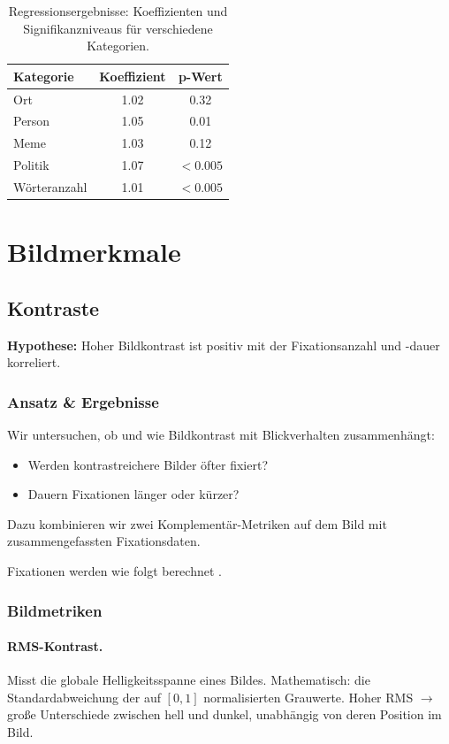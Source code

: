 \documentclass[
    language=german, %
    thesis=seminar, %
    supervisor=postdoc, %
    multiauthor=true, %
    ]{settings/csssa-thesis}
\begin{document}
\begin{table}[htbp]
\centering
\begin{tabular}{lcc}
\hline
\textbf{Kategorie} & \textbf{Koeffizient} & \textbf{p-Wert} \\
\hline
Ort          & 1.02 & 0.32      \\
Person       & 1.05 & 0.01      \\
Meme         & 1.03 & 0.12      \\
Politik      & 1.07 & $<0.005$ \\
Wörteranzahl & 1.01 & $<0.005$ \\
\hline
\end{tabular}
\caption{Regressionsergebnisse: Koeffizienten und Signifikanzniveaus für verschiedene Kategorien.}
\label{tab:kategorien}
\end{table}

\section{Bildmerkmale}
\subsection{Kontraste}

\textbf{Hypothese:} Hoher Bildkontrast ist positiv mit der Fixationsanzahl und -dauer korreliert. 

\subsubsection{Ansatz \& Ergebnisse}
Wir untersuchen, ob und wie Bildkontrast mit Blickverhalten zusammenhängt: 
\begin{itemize}
    \item Werden kontrastreichere Bilder öfter fixiert? 
    \item Dauern Fixationen länger oder kürzer? 
\end{itemize}
Dazu kombinieren wir zwei Komplementär-Metriken auf dem Bild mit zusammengefassten Fixationsdaten. 

Fixationen werden wie folgt berechnet \cite{Salvucci_IdentifyingFixations}. 

\subsubsection{Bildmetriken}
\paragraph{RMS-Kontrast.} 
Misst die globale Helligkeitsspanne eines Bildes. Mathematisch: die Standardabweichung der auf $[0,1]$ 
normalisierten Grauwerte. Hoher RMS $\rightarrow$ große Unterschiede zwischen hell und dunkel, unabhängig von deren Position im Bild. 
\end{document}
